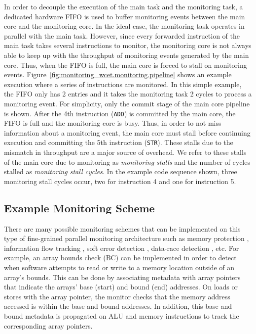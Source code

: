 In order to decouple the execution of the main task and the monitoring task, a
dedicated hardware FIFO is used to buffer monitoring events between the main
core and the monitoring core.  In the ideal case, the monitoring task operates
in parallel with the main task.  However, since 
every forwarded instruction of the main task
takes several instructions to monitor, the monitoring core is not always able to keep
up with the throughput of monitoring events generated by the main core.  Thus,
when the FIFO is full, the main core is forced to stall on monitoring events.
Figure~\ref{fig:monitoring_wcet.monitoring.pipeline} shows an example
execution where a series of instructions are monitored. In this simple example,
the FIFO only has 2 entries and it takes the monitoring task 2 cycles to
process a monitoring event. For simplicity, only the commit stage of the main
core pipeline is shown.  After the 4th instruction ({\tt ADD}) is committed by
the main core, the FIFO is full and the monitoring core is busy. Thus, in order
to not miss information about a monitoring event, the main core must stall
before continuing execution and committing the 5th instruction ({\tt STR}).
These stalls due to the mismatch in throughput are a major source of overhead.
We refer to these stalls of the main core due to monitoring as \emph{monitoring
stalls} and the number of cycles stalled as \emph{monitoring stall cycles}. In
the example code sequence shown, three monitoring stall cycles occur, two for
instruction 4 and one for instruction 5.

\subsection{Example Monitoring Scheme}

There are many possible monitoring schemes that can be implemented on this type
of fine-grained parallel monitoring architecture such as memory protection
\cite{mondrian-asplos02}, information flow tracking \cite{dift-asplos04,
testudo-micro08}, soft error detection \cite{argus-micro07}, data-race
detection \cite{cord-hpca06, eraser-tocs97, literace-pldi09, pacer-pldi10},
etc.  For example, an array bounds check (BC) \cite{hardbound-asplos08} can be
implemented in order to detect when software attempts to read or write to a
memory location outside of an array's bounds. This can be done by associating
metadata with array pointers that indicate the arrays' base (start) and bound
(end) addresses. On loads or stores with the array pointer, the monitor checks
that the memory address accessed is within the base and bound addresses. In
addition, this base and bound metadata is propagated on ALU and memory
instructions to track the corresponding array pointers.

